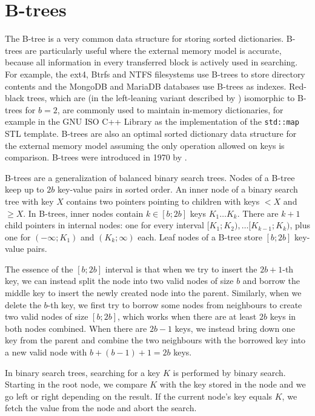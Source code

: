 \chapter{B-trees}
\label{chapter:btree}
The B-tree is a very common data structure for storing sorted dictionaries.
B-trees are particularly useful where the external memory model is accurate,
because all information in every transferred block is actively used
in searching. For example, the ext4, Btrfs and NTFS filesystems use B-trees
to store directory contents and the MongoDB and MariaDB databases use B-trees
as indexes. Red-black trees, which are (in the left-leaning variant
described by \cite{left-leaning}) isomorphic to B-trees for $b=2$, are
commonly used to maintain in-memory dictionaries, for example in the GNU ISO
C++ Library as the implementation of the \texttt{std::map} STL template.
B-trees are also an optimal sorted dictionary data structure
for the external memory model assuming the only operation allowed on
keys is comparison.
B-trees were introduced in 1970 by \cite{btree}.

B-trees are a generalization of balanced binary search trees.
Nodes of a B-tree keep up to $2b$ key-value pairs in sorted order.
An inner node of a binary search tree with key $X$ contains two pointers
pointing to children with keys $< X$ and $\geq X$. In B-trees,
inner nodes contain $k\in[b;2b]$ keys $K_1\ldots K_k$. There are $k+1$
child pointers in internal nodes: one for every interval
$[K_1;K_2),\ldots [K_{k-1};K_k)$, plus one for $(-\infty;K_1)$ and
$(K_k;\infty)$ each.
Leaf nodes of a B-tree store $[b;2b]$ key-value pairs.

The essence of the $[b;2b]$ interval is that when we try to insert the $2b+1$-th
key, we can instead split the node into two valid nodes of size $b$ and borrow
the middle key to insert the newly created node into the parent.
Similarly, when we delete the $b$-th key, we first try to borrow some nodes
from neighbours to create two valid nodes of size $[b;2b]$, which works when
there are at least $2b$ keys in both nodes combined.
When there are $2b-1$ keys, we instead bring down one key from the parent
and combine the two neighbours with the borrowed key into a new valid node with
$b+(b-1)+1=2b$ keys.

In binary search trees, searching for a key $K$ is performed by binary search.
Starting in the root node, we compare $K$ with the key stored in the node
and we go left or right depending on the result. If the current node's key
equals $K$, we fetch the value from the node and abort the search.

